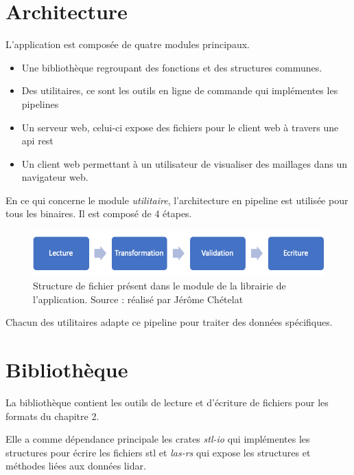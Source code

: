 \section{Architecture}

L'application est composée de quatre modules principaux.

\begin{itemize}
	\item Une bibliothèque regroupant des fonctions et des structures communes.
	\item Des utilitaires, ce sont les outils en ligne de commande qui
		implémentes les pipelines 
	\item Un serveur web, celui-ci expose des fichiers pour le client web à
		travers une api \gls{rest}
	\item Un client web permettant à un utilisateur de visualiser des maillages
		dans un navigateur web.
\end{itemize}

En ce qui concerne le module \textit{utilitaire}, l'architecture en pipeline est
utilisée pour tous les binaires. Il est composé de 4 étapes. 

\begin{figure}[htbp!]
    \centering
    \includegraphics[width=0.7\linewidth]{figures/pipeline_process.png}
    \caption{Structure de fichier présent dans le module de la librairie de l'application. Source : réalisé par Jérôme Chételat}
    \label{fig:pipeline_process}
\end{figure}

Chacun des utilitaires adapte ce pipeline pour traiter des données spécifiques.

\section{Bibliothèque}

La bibliothèque contient les outils de lecture et d'écriture de fichiers pour les formats du chapitre 2.

Elle a comme dépendance principale les crates \textit{stl-io}
qui implémentes les structures pour écrire les fichiers \gls{stl} 
et \textit{las-rs} qui expose les structures et méthodes liées aux données lidar.

